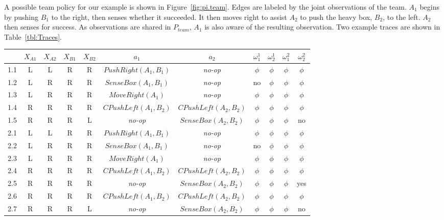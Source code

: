 \documentclass[runningheads]{llncs}
\newcommand{\PushRight}{\mathit{PushRight}}
\newcommand{\CPushLeft}{\mathit{CPushLeft}}
\begin{document}
\begin{example}
A possible team policy for our example is shown in Figure~\ref{fig:pi.team}. Edges are labeled by the joint observations of the team.
$A_1$ begins by pushing $B_1$ to the right, then senses whether it succeeded. It then moves right to assist $A_2$ to push the heavy box, $B_2$, to the left. $A_2$ then senses for success. As observations are shared in $P_{team}$, $A_1$ is also aware of the resulting observation. Two example traces are shown in Table~\ref{tbl:Traces}. 




\begin{table}[t]
    \centering
    \scriptsize
    \begin{tabular}{|c||c|c|c|c||c|c||c|c|c|c|}
    \hline
     &$X_{A1}$&$X_{A2}$&$X_{B1}$&$X_{B2}$&$a_1$&$a_2$&$\omega^1_1$&$\omega^1_2$&$\omega^2_1$&$\omega^2_2$\\ \hline
    1.1 &L&L&R&R&$\PushRight(A_1,B_1)$&{\em no-op}&$\phi$& $\phi$&$\phi$& $\phi$\\
    1.2 &L&R&R&R&$SenseBox(A_1,B_1)$&{\em no-op}& no& $\phi$ &$\phi$& $\phi$\\
    1.3 &L&R&R&R&$MoveRight(A_1)$&{\em no-op}&$\phi$&$\phi$ &$\phi$& $\phi$\\
    1.4 &R&R&R&R&$\CPushLeft(A_1,B_2)$&$\CPushLeft(A_2,B_2)$&$\phi$&$\phi$ &$\phi$& $\phi$\\
    1.5 &R&R&R&L&{\em no-op}&$SenseBox(A_2,B_2)$&$\phi$&$\phi$ &$\phi$& no\\ \hline
    \hline\hline
    2.1 &L&L&R&R&$\PushRight(A_1,B_1)$&{\em no-op}&$\phi$& $\phi$&$\phi$& $\phi$\\
    2.2 &L&R&R&R&$SenseBox(A_1,B_1)$&{\em no-op}& no& $\phi$ &$\phi$& $\phi$\\
    2.3 &L&R&R&R&$MoveRight(A_1)$&{\em no-op}&$\phi$&$\phi$ &$\phi$& $\phi$\\
    2.4 &R&R&R&R&$\CPushLeft(A_1,B_2)$&$\CPushLeft(A_2,B_2)$&$\phi$&$\phi$ &$\phi$& $\phi$\\
    2.5 &R&R&R&R&{\em no-op}&$SenseBox(A_2,B_2)$&$\phi$&$\phi$ &$\phi$& yes\\ 
    2.6 &R&R&R&R&$\CPushLeft(A_1,B_2)$&$\CPushLeft(A_2,B_2)$&$\phi$&$\phi$ &$\phi$& $\phi$\\
    2.7 &R&R&R&L&{\em no-op}&$SenseBox(A_2,B_2)$&$\phi$&$\phi$ &$\phi$& no\\ \hline
  

\end{tabular}
\end{table}
\end{example}
\end{document}
